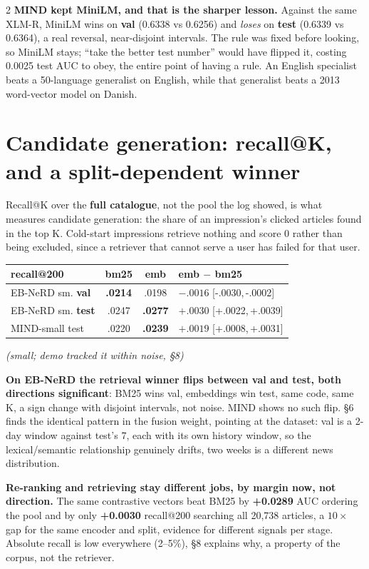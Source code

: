 \documentclass[10pt,a4paper]{article}
\newcommand{\tabsize}{\footnotesize}
\newcommand{\ci}[2]{{\scriptsize[#1,\,#2]}}
\begin{document}
\begin{multicols}{2}
\textbf{MIND kept MiniLM, and that is the sharper lesson.} Against the same XLM-R, MiniLM wins on
\textbf{val} (0.6338 vs 0.6256) and \emph{loses} on \textbf{test} (0.6339 vs 0.6364), a real reversal,
near-disjoint intervals. The rule was fixed before looking, so MiniLM stays; ``take the better test
number'' would have flipped it, costing 0.0025 test AUC to obey, the entire point of having a rule. An
English specialist beats a 50-language generalist on English, while that generalist beats a 2013
word-vector model on Danish.

\section{Candidate generation: recall@K, and a split-dependent winner}

Recall@K over the \textbf{full catalogue}, not the pool the log showed, is what measures candidate
generation: the share of an impression's clicked articles found in the top K. Cold-start impressions
retrieve nothing and score 0 rather than being excluded, since a retriever that cannot serve a user has
failed for that user.

\begin{center}\tabsize
\begin{tabular}{@{}lccl@{}}
\toprule
recall@200 & bm25 & emb & emb $-$ bm25 \\
\midrule
EB-NeRD sm. \textbf{val} & \textbf{.0214} & .0198 & $\mathbf{-.0016}$ \ci{-.0030}{-.0002} \\
EB-NeRD sm. \textbf{test} & .0247 & \textbf{.0277} & $\mathbf{+.0030}$ \ci{+.0022}{+.0039} \\
MIND-small test & .0220 & \textbf{.0239} & $+.0019$ \ci{+.0008}{+.0031} \\
\bottomrule
\end{tabular}
\end{center}

\emph{(small; demo tracked it within noise, \S8)}

\textbf{On EB-NeRD the retrieval winner flips between val and test, both directions significant}: BM25
wins val, embeddings win test, same code, same K, a sign change with disjoint intervals, not noise.
MIND shows no such flip. \S6 finds the identical pattern in the fusion weight, pointing at the dataset:
val is a 2-day window against test's 7, each with its own history window, so the lexical/semantic
relationship genuinely drifts, two weeks is a different news distribution.

\textbf{Re-ranking and retrieving stay different jobs, by margin now, not direction.} The same
contrastive vectors beat BM25 by \textbf{+0.0289} AUC ordering the pool and by only \textbf{+0.0030}
recall@200 searching all 20,738 articles, a $10\times$ gap for the same encoder and split, evidence for
different signals per stage. Absolute recall is low everywhere (2--5\%), \S8 explains why, a property
of the corpus, not the retriever.


\end{multicols}
\end{document}

